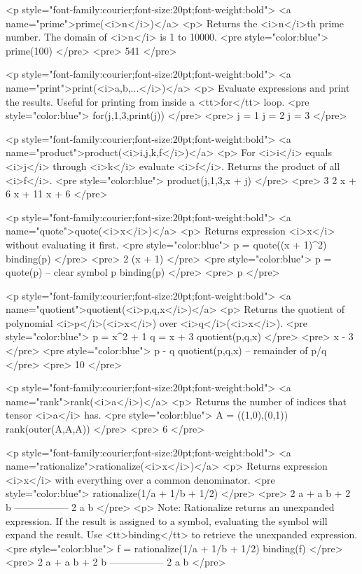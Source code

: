 <p style="font-family:courier;font-size:20pt;font-weight:bold">
<a name="prime">prime(<i>n</i>)</a>
<p>
Returns the <i>n</i>th prime number.
The domain of <i>n</i> is 1 to 10000.
<pre style="color:blue">
prime(100)
</pre>
<pre>
541
</pre>

<p style="font-family:courier;font-size:20pt;font-weight:bold">
<a name="print">print(<i>a,b,...</i>)</a>
<p>
Evaluate expressions and print the results.
Useful for printing from inside a <tt>for</tt> loop.
<pre style="color:blue">
for(j,1,3,print(j))
</pre>
<pre>
j = 1
j = 2
j = 3
</pre>

<p style="font-family:courier;font-size:20pt;font-weight:bold">
<a name="product">product(<i>i,j,k,f</i>)</a>
<p>
For <i>i</i> equals <i>j</i> through <i>k</i> evaluate <i>f</i>.
Returns the product of all <i>f</i>.
<pre style="color:blue">
product(j,1,3,x + j)
</pre>
<pre>
 3      2
x  + 6 x  + 11 x + 6
</pre>

<p style="font-family:courier;font-size:20pt;font-weight:bold">
<a name="quote">quote(<i>x</i>)</a>
<p>
Returns expression <i>x</i> without evaluating it first.
<pre style="color:blue">
p = quote((x + 1)^2)
binding(p)
</pre>
<pre>
       2
(x + 1)
</pre>
<pre style="color:blue">
p = quote(p) -- clear symbol p
binding(p)
</pre>
<pre>
p
</pre>

<p style="font-family:courier;font-size:20pt;font-weight:bold">
<a name="quotient">quotient(<i>p,q,x</i>)</a>
<p>
Returns the quotient of polynomial <i>p</i>(<i>x</i>) over <i>q</i>(<i>x</i>).
<pre style="color:blue">
p = x^2 + 1
q = x + 3
quotient(p,q,x)
</pre>
<pre>
x - 3
</pre>
<pre style="color:blue">
p - q quotient(p,q,x) -- remainder of p/q
</pre>
<pre>
10
</pre>

<p style="font-family:courier;font-size:20pt;font-weight:bold">
<a name="rank">rank(<i>a</i>)</a>
<p>
Returns the number of indices that tensor <i>a</i> has.
<pre style="color:blue">
A = ((1,0),(0,1))
rank(outer(A,A,A))
</pre>
<pre>
6
</pre>

<p style="font-family:courier;font-size:20pt;font-weight:bold">
<a name="rationalize">rationalize(<i>x</i>)</a>
<p>
Returns expression <i>x</i> with everything over a common denominator.
<pre style="color:blue">
rationalize(1/a + 1/b + 1/2)
</pre>
<pre>
 2 a + a b + 2 b
-----------------
      2 a b
</pre>
<p>
Note: Rationalize returns an unexpanded expression.
If the result is assigned to a symbol,
evaluating the symbol will expand the result.
Use <tt>binding</tt> to retrieve the unexpanded expression.
<pre style="color:blue">
f = rationalize(1/a + 1/b + 1/2)
binding(f)
</pre>
<pre>
 2 a + a b + 2 b
-----------------
      2 a b
</pre>


